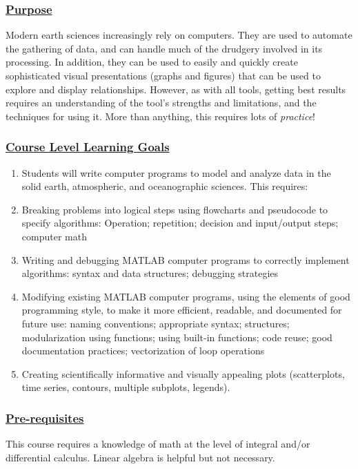 \documentclass[12pt]{article}
\renewcommand{\section}[1]{\vspace{0pt}\subsubsection*{\underline{\large #1}}\vspace{-10pt}}
\begin{document}
\section{Purpose}
Modern earth sciences increasingly rely on computers. They are used to 
automate the gathering of data,
and can handle much of the drudgery involved in its processing.
In addition, they can be used to easily and quickly create sophisticated
visual presentations (graphs and figures) that can be used to explore
and display relationships. However, as with all tools,  getting best
results requires an understanding of the tool's strengths and
limitations, and the techniques for using it. More than anything, this requires lots of \emph{practice}!

\newpage
\section{Course Level Learning Goals}
 
\begin{enumerate}
\item Students will write computer programs to model and analyze data in 
the solid earth, atmospheric, and oceanographic sciences. This requires:
\item Breaking problems into logical steps  using flowcharts and pseudocode to  specify algorithms: Operation; repetition; decision and input/output steps; computer math
\item Writing and debugging MATLAB computer programs to correctly implement algorithms: syntax and data structures; debugging strategies
\item Modifying existing MATLAB computer programs, using the elements of good programming style, to make it more efficient, readable, and documented for future use:
naming conventions; appropriate syntax; structures; modularization using functions; using built-in functions; code reuse; good documentation practices; vectorization of loop operations
\item Creating scientifically informative and visually appealing plots 
(scatterplots, time series, contours, multiple subplots, legends).  
\end{enumerate}
 
 \section{Pre-requisites}

This course requires a knowledge of math at the level of integral and/or
differential calculus. Linear algebra is helpful but not necessary.
\end{document}

